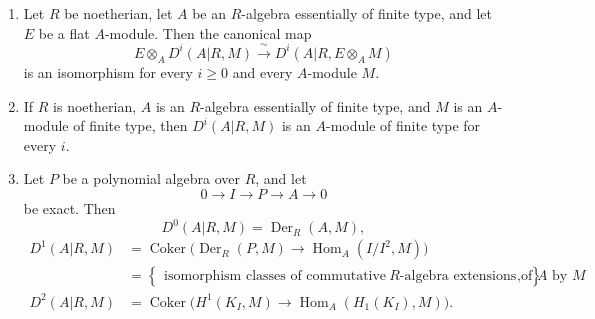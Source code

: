 \begin{enumerate}[label=(\arabic*)]
\item Let $R$ be noetherian, let $A$ be an $R$-algebra essentially
of finite type, and let $E$ be a flat $A$-module. Then the canonical
map
\[
 E\otimes_AD^i(A|R,M)
 \xrightarrow{\ \sim\ }
 D^i(A|R,E\otimes_AM)
\]
is an isomorphism for every $i\geq0$ and every $A$-module $M$.

\item If $R$ is noetherian, $A$ is an $R$-algebra essentially of
finite type, and $M$ is an $A$-module of finite type, then
$D^i(A|R,M)$ is an $A$-module of finite type for every $i$.

\item Let $P$ be a polynomial algebra over $R$, and let
\[
 0\longrightarrow I\longrightarrow P\longrightarrow A
 \longrightarrow0
\]
be exact. Then
\[
 D^0(A|R,M)=\operatorname{Der}_R(A,M),
\]
\begin{align*}
D^1(A|R,M)
 &=\operatorname{Coker}\bigl(
   \operatorname{Der}_R(P,M)\longrightarrow
   \operatorname{Hom}_A(I/I^2,M)\bigr)\\
 &=\left\{
   \begin{array}{c}
   \text{isomorphism classes of commutative}\
   R\text{-algebra extensions of }A\text{ by }M
   \end{array}\right\},\\
D^2(A|R,M)
 &=\operatorname{Coker}\bigl(
   H^1(K_I,M)\longrightarrow
   \operatorname{Hom}_A(H_1(K_I),M)\bigr).
\end{align*}
\end{enumerate}
